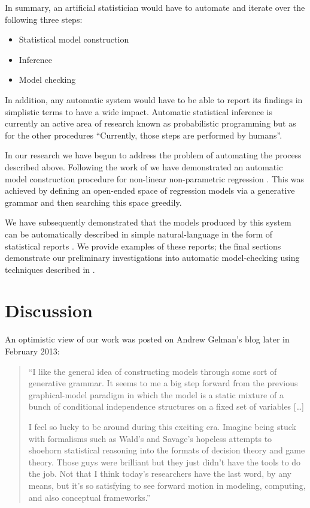 \documentclass{article} %
\begin{document}
In summary, an artificial statistician would have to automate and iterate over the following three steps:
\begin{itemize}
  \item Statistical model construction
  \item Inference
  \item Model checking
\end{itemize}

In addition, any automatic system would have to be able to report its findings in simplistic terms to have a wide impact.
Automatic statistical inference is currently an active area of research known as probabilistic programming but as for the other procedures ``Currently, those steps are performed by humans''.

In our research we have begun to address the problem of automating the process described above.
Following the work of \cite{grosse2012exploiting} we have demonstrated an automatic model construction procedure for non-linear non-parametric regression \citep{DuvLloGroetal13}.
This was achieved by defining an open-ended space of regression models via a generative grammar and then searching this space greedily.

We have subsequently demonstrated that the models produced by this system can be automatically described in simple natural-language in the form of statistical reports \citep{LloDuvGroetal13}.
We provide examples of these reports; the final sections demonstrate our preliminary investigations into automatic model-checking using techniques described in \cite{gelman1996posterior}.

\section{Discussion}

An optimistic view of our work was posted on Andrew Gelman's blog later in February 2013:
\begin{quotation}
``I like the general idea of constructing models through some sort of generative grammar.
It seems to me a big step forward from the previous graphical-model paradigm in which the model is a static mixture of a bunch of conditional independence structures on a fixed set of variables [\ldots]

I feel so lucky to be around during this exciting era.
Imagine being stuck with formalisms such as Wald's and Savage's hopeless attempts to shoehorn statistical reasoning into the formats of decision theory and game theory.
Those guys were brilliant but they just didn't have the tools to do the job.
Not that I think today's researchers have the last word, by any means, but it's so satisfying to see forward motion in modeling, computing, and also conceptual frameworks.''
\end{quotation}
\end{document}
